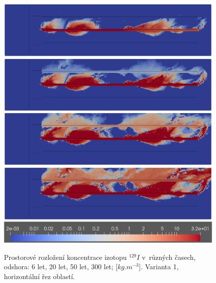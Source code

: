 \documentclass[11pt,a4paper]{article}
\begin{document}
\begin{onehalfspacing}
\begin{figure}[H]
\centering
\includegraphics[width=16cm]{graphics/obr_ralek/nek_zdroj/05_6a.png}
\includegraphics[width=16cm]{graphics/obr_ralek/nek_zdroj/06_20a.png}
\includegraphics[width=16cm]{graphics/obr_ralek/nek_zdroj/07_50a.png}
\includegraphics[width=16cm]{graphics/obr_ralek/nek_zdroj/08_300a.png}
\includegraphics[width=16cm]{graphics/obr_ralek/nek_zdroj/skala_nek_zdroj.png}
\caption{Prostorové rozložení koncentrace izotopu $^{129}I$ v~různých časech, odshora: 6 let, 20 let, 50 let, 300 let; [$kg.m^{-3}$]. Varianta 1, horizontální řez oblastí.}
\label{nek_zdroj_02}
\end{figure}


\end{onehalfspacing}
\end{document}

